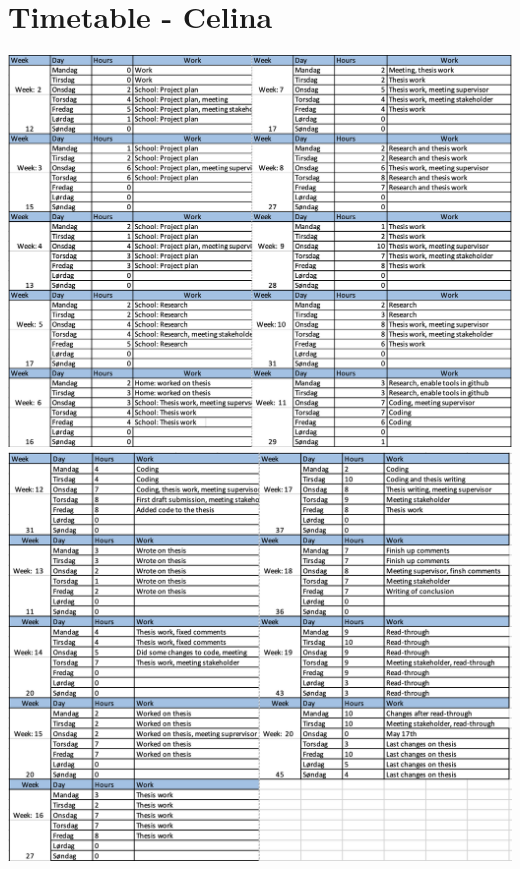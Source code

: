 \section{Timetable - Celina}
\vspace{3cm}
\includegraphics[width=\textwidth]{Images/TimesheetC1.png}
\newpage
\vspace{3cm}
\includegraphics[width=\textwidth]{Images/TimesheetC2.png}
\newpage
